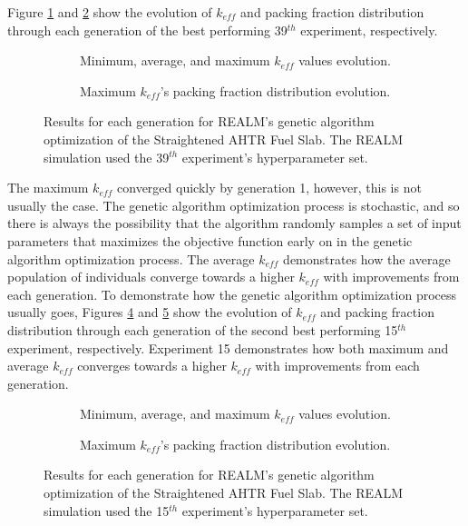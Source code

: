 Figure \ref{fig:keff_conv_39} and \ref{fig:pf_39} show the evolution of $k_{eff}$ 
and packing fraction distribution through each generation of the best performing 
39$^{th}$ experiment, respectively. 
\begin{figure}[]
    \centering
    \begin{subfigure}{\textwidth}
    \caption{Minimum, average, and maximum $k_{eff}$ values evolution.}
    \label{fig:keff_conv_39}
    \end{subfigure}
    \begin{subfigure}{\textwidth}
        \caption{Maximum $k_{eff}$'s packing fraction distribution evolution.}
        \label{fig:pf_39}
    \end{subfigure}
    \caption{ Results for each generation for REALM's genetic algorithm optimization 
    of the Straightened \acrfull{AHTR} Fuel Slab. The REALM simulation used 
    the 39$^{th}$ experiment's hyperparameter set.}
    \label{fig:39}
\end{figure}
The maximum $k_{eff}$ converged quickly by generation 1, however, this is not 
usually the case. 
The genetic algorithm optimization process is stochastic, and so there is always 
the possibility that the algorithm randomly samples a set of input parameters
that maximizes the objective function early on in the genetic algorithm 
optimization process. 
The average $k_{eff}$ demonstrates how the average population of individuals converge 
towards a higher $k_{eff}$ with improvements from each generation. 
To demonstrate how the genetic algorithm optimization process usually goes, 
Figures \ref{fig:keff_conv_15} and \ref{fig:pf_15} show the evolution of $k_{eff}$ 
and packing fraction distribution through each generation of the second best 
performing 15$^{th}$ experiment, respectively. 
Experiment 15 demonstrates how both maximum and average $k_{eff}$ converges 
towards a higher $k_{eff}$ with improvements from each generation.
\begin{figure}[]
    \centering
    \begin{subfigure}{\textwidth}
    \caption{Minimum, average, and maximum $k_{eff}$ values evolution.}
    \label{fig:keff_conv_15}
    \end{subfigure}
    \begin{subfigure}{\textwidth}
        \caption{Maximum $k_{eff}$'s packing fraction distribution evolution.}
        \label{fig:pf_15}
    \end{subfigure}
    \caption{ Results for each generation for REALM's genetic algorithm optimization 
    of the Straightened \acrfull{AHTR} Fuel Slab. The REALM simulation used 
    the 15$^{th}$ experiment's hyperparameter set.}
    \label{fig:15}
\end{figure}

